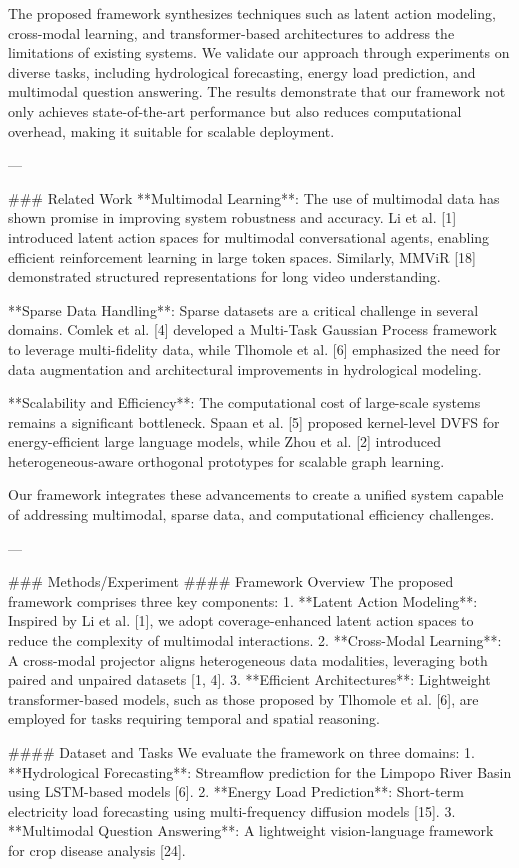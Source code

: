 The proposed framework synthesizes techniques such as latent action modeling, cross-modal learning, and transformer-based architectures to address the limitations of existing systems. We validate our approach through experiments on diverse tasks, including hydrological forecasting, energy load prediction, and multimodal question answering. The results demonstrate that our framework not only achieves state-of-the-art performance but also reduces computational overhead, making it suitable for scalable deployment.

---

### Related Work
**Multimodal Learning**: The use of multimodal data has shown promise in improving system robustness and accuracy. Li et al. [1] introduced latent action spaces for multimodal conversational agents, enabling efficient reinforcement learning in large token spaces. Similarly, MMViR [18] demonstrated structured representations for long video understanding.

**Sparse Data Handling**: Sparse datasets are a critical challenge in several domains. Comlek et al. [4] developed a Multi-Task Gaussian Process framework to leverage multi-fidelity data, while Tlhomole et al. [6] emphasized the need for data augmentation and architectural improvements in hydrological modeling.

**Scalability and Efficiency**: The computational cost of large-scale systems remains a significant bottleneck. Spaan et al. [5] proposed kernel-level DVFS for energy-efficient large language models, while Zhou et al. [2] introduced heterogeneous-aware orthogonal prototypes for scalable graph learning.

Our framework integrates these advancements to create a unified system capable of addressing multimodal, sparse data, and computational efficiency challenges.

---

### Methods/Experiment
#### Framework Overview
The proposed framework comprises three key components:
1. **Latent Action Modeling**: Inspired by Li et al. [1], we adopt coverage-enhanced latent action spaces to reduce the complexity of multimodal interactions.
2. **Cross-Modal Learning**: A cross-modal projector aligns heterogeneous data modalities, leveraging both paired and unpaired datasets [1, 4].
3. **Efficient Architectures**: Lightweight transformer-based models, such as those proposed by Tlhomole et al. [6], are employed for tasks requiring temporal and spatial reasoning.

#### Dataset and Tasks
We evaluate the framework on three domains:
1. **Hydrological Forecasting**: Streamflow prediction for the Limpopo River Basin using LSTM-based models [6].
2. **Energy Load Prediction**: Short-term electricity load forecasting using multi-frequency diffusion models [15].
3. **Multimodal Question Answering**: A lightweight vision-language framework for crop disease analysis [24].

